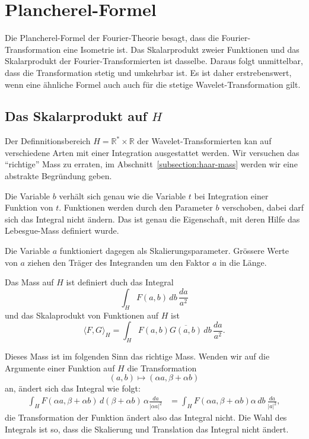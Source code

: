 %
%
%
\section{Plancherel-Formel%
\label{section:cwt:plancherel}}
Die Plancherel-Formel der Fourier-Theorie besagt, dass die
Fourier-Transformation eine Isometrie ist.
Das Skalarprodukt zweier Funktionen und das Skalarprodukt der
Fourier-Transformierten ist dasselbe.
Daraus folgt unmittelbar, dass die Transformation stetig und
umkehrbar ist.
Es ist daher erstrebenswert, wenn eine ähnliche Formel auch
auch für die stetige Wavelet-Transformation gilt.

\subsection{Das Skalarprodukt auf $H$}
Der Definnitionsbereich $H=\mathbb R^* \times \mathbb R$ der
Wavelet-Transformierten kan auf verschiedene Arten mit einer Integration
ausgestattet werden.
Wir versuchen das ``richtige'' Mass zu erraten, im
Abschnitt~\ref{subsection:haar-mass} werden wir eine abstrakte Begründung
geben.

Die Variable $b$ verhält sich genau wie die Variable $t$ bei Integration
einer Funktion von $t$.
Funktionen werden durch den Parameter $b$ verschoben, dabei darf sich
das Integral nicht ändern.
Das ist genau die Eigenschaft, mit deren Hilfe das Lebesgue-Mass
definiert wurde.

Die Variable $a$ funktioniert dagegen als Skalierungsparameter.
Grössere Werte von $a$ ziehen den Träger des Integranden um den Faktor $a$ 
in die Länge.

\begin{definition}
\label{cwt:definition:plancherel}
Das Mass auf $H$ ist definiert duch das Integral
\[
\int_H F(a,b)\,db \,\frac{da}{a^2}
\]
und das Skalaprodukt von Funktionen auf $H$ ist
\[
\langle F,G\rangle_H
=
\int_{H} F(a,b)\overline{G(a,b)}\,db \,\frac{da}{a^2}.
\]
\end{definition}

Dieses Mass ist im folgenden Sinn das richtige Mass.
Wenden wir auf die Argumente einer Funktion auf $H$ die Transformation
\[
(a,b) \mapsto (\alpha a, \beta + \alpha b)
\]
an, ändert sich das Integral wie folgt:
\begin{align*}
\int_H F(\alpha a,\beta + \alpha b)\,d(\beta + \alpha b)\,\alpha\frac{da}{|\alpha a|^2}
&=
\int_H F(\alpha a,\beta + \alpha b) \alpha\,db \ \frac{da}{|a|^2},
\end{align*}
die Transformation der Funktion ändert also das Integral nicht.
Die Wahl des Integrals ist so, dass die Skalierung und Translation
das Integral nicht ändert.


